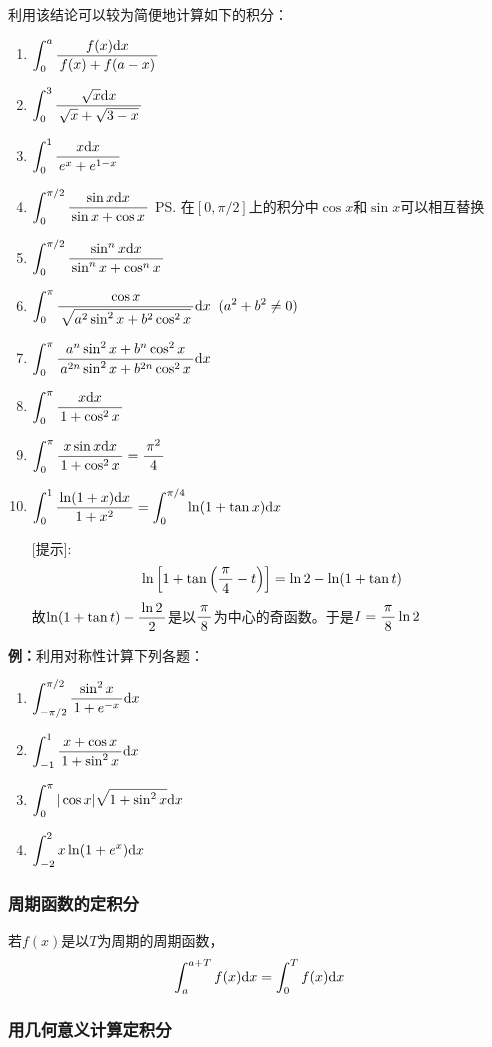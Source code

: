 利用该结论可以较为简便地计算如下的积分：
\begin{enumerate}[(1)]
  \setlength{\itemindent}{1cm}
  \item $\dint_0^a\df{f(x)\d x}{f(x)+f(a-x)}$
  \item $\dint_0^3\df{\sqrt x\d x}{\sqrt x+\sqrt{3-x}}$
  \item $\dint_0^1\df{x\d x}{e^x+e^{1-x}}$
  \item $\dint_0^{\pi/2}\df{\sin x\d x}{\sin x+\cos x}$
  \ps{在$[0,\pi/2]$上的积分中$\cos x$和$\sin x$可以相互替换}
  \item $\dint_0^{\pi/2}\df{\sin^nx\d x}{\sin^nx+\cos^nx}$
  \item $\dint_0^{\pi}\df{\cos x}{\sqrt{a^2\sin^2x+b^2\cos^2x}}\d
  x\;\;(a^2+b^2\ne 0)$
  \item $\dint_0^{\pi}\df{a^n\sin^2x+b^n\cos^2x}
  {a^{2n}\sin^2x+b^{2n}\cos^2x}\d x$
  \item $\dint_0^{\pi}\df{x\d x}{1+\cos^2x}$
  \item $\dint_0^{\pi}\df{x\sin x\d x}{1+\cos^2x}=\df{\pi^2}4$
  \item $\dint_0^1\df{\ln(1+x)\d x}{1+x^2}=\dint_0^{\pi/4}\ln(1+\tan x)\d x$
  
  [提示]:
  $$\ln\left[1+\tan\left(\df{\pi}4-t\right)\right]=\ln2-\ln(1+\tan t)$$
  故$\ln(1+\tan t)-\df{\ln2}2$是以$\df{\pi}8$为中心的奇函数。于是$I=\df{\pi}8\ln2$
\end{enumerate}

{\bf 例：}利用对称性计算下列各题：
\begin{enumerate}[(1)]
  \setlength{\itemindent}{1cm}
  \item $\dint_{-\pi/2}^{\pi/2}\df{\sin^2x}{1+e^{-x}}\d x$
  \item $\dint_{-1}^1\df{x+\cos x}{1+\sin^2x}\d x$
  \item $\dint_{0}^{\pi}|\cos x|\sqrt{1+\sin^2x}\d x$
  \item $\dint_{-2}^2x\ln(1+e^x)\d x$
\end{enumerate}

\subsubsection{周期函数的定积分}

\begin{thx}
	若$f(x)$是以$T$为周期的周期函数，
	$$\dint_a^{a+T}f(x)\d x=\dint_0^{T}f(x)\d x$$
\end{thx}

\subsubsection{用几何意义计算定积分}

